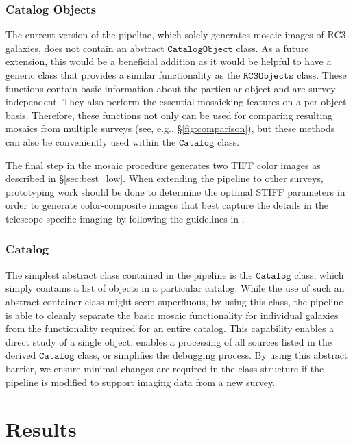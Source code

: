 \documentclass[authoryear, 12pt, 5p, times]{elsarticle}
\begin{document}
\subsubsection{Catalog Objects}

The current version of the pipeline, which solely generates mosaic images of RC3 galaxies, does not contain an abstract $\texttt{CatalogObject}$ class. As a future extension, this would be a beneficial addition as it would be helpful to have a generic class that provides a similar functionality as the $\texttt{RC3Objects}$ class. These functions contain basic information about the particular object and are survey-independent. They also perform the essential mosaicking features on a per-object basis. Therefore, these functions not only can be used for comparing resulting mosaics from multiple surveys (see, e.g., \S\ref{fig:comparison}), but these methods can also be conveniently used within the $\texttt{Catalog}$ class. 

The final step in the mosaic procedure generates two TIFF color images as described in \S\ref{sec:best_low}.  When extending the pipeline to other surveys, prototyping work should be done to determine the optimal STIFF parameters in order to generate color-composite images that best capture the details in the telescope-specific imaging by following the guidelines in \citet{stiff}.

\subsubsection{Catalog}

The simplest abstract class contained in the pipeline is the $\texttt{Catalog}$ class, which simply contains a list of objects in a particular catalog. While the use of such an abstract container class might seem superfluous, by using this class, the pipeline is able to cleanly separate the basic mosaic functionality for individual galaxies from the functionality required for an entire catalog. This capability enables a direct study of a single object, enables a processing of all sources listed in the derived $\texttt{Catalog}$ class, or simplifies the debugging process. By using this abstract barrier, we ensure minimal changes are required in the class structure if the pipeline is modified to support imaging data from a new survey.

\section{Results\label{results-sec}}
\end{document}

